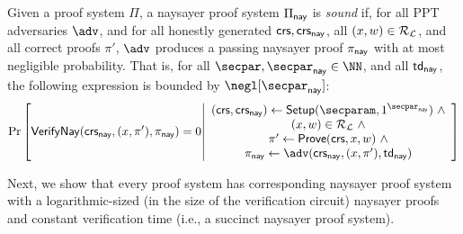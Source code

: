 \begin{definition} Given a proof system $\Pi$, a naysayer proof system $\Pi_{\mathsf{nay}}$ is \emph{sound} if, for all PPT adversaries $\adv$, and for all honestly generated $\mathsf{crs}, \mathsf{crs}_{\mathsf{nay}}$, all $(x,w) \in \mathcal{R}_{\mathcal{L}}$, and all correct proofs $\pi'$, $\adv$ produces a passing naysayer proof $\pi_{\mathsf{nay}}$ with at most negligible probability. That is, for all $\secpar, \naysecpar \in \NN$, and all $\mathsf{td}_{\mathsf{nay}}$, the following expression is bounded by $\negl[\naysecpar]$:\footnotemark
\begin{equation*}
    \Pr\left[
        \vrfynay(\crs_{\nay}, (x,\pi'), \pi_{\nay})=0 
        \middle| 
        \begin{array}{c}
            (\crs, \crs_\nay) \gets \Setup(\secparam, \naysecparam)~\land\\
            (x,w) \in \Rel_\Lang~\land\\
            \pi' \gets \prove(\crs, x, w)~\land\\
            \pi_\nay \gets \adv(\crs_\nay, (x, \pi'), \td_\nay)
        \end{array}
    \right] %
\end{equation*}
\end{definition}

Next, we show that every proof system has corresponding naysayer proof system with a logarithmic-sized (in the size of the verification circuit) naysayer proofs and constant verification time (i.e., a succinct naysayer proof system). %

